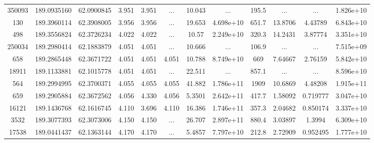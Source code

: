 \begin{table*}
\begin{tabular}{cccccccccccc}
         350093 &     189.0935160 &      62.0900845 &           3.951 &           3.951 &             ... &          10.043 &             ... &           195.5 &             ... &             ... &       1.826e+10 \\
            130 &     189.3960114 &      62.3908005 &           3.956 &           3.956 &             ... &          19.653 &       4.698e+10 &           651.7 &         13.8706 &         4.43789 &       6.843e+10 \\
            498 &     189.3556824 &      62.3726234 &           4.022 &           4.022 &             ... &           10.57 &       2.249e+10 &           320.3 &         14.2431 &         3.87774 &       3.351e+10 \\
         250034 &     189.2980414 &      62.1883879 &           4.051 &           4.051 &             ... &          10.666 &             ... &           106.9 &             ... &             ... &       7.515e+09 \\
            658 &     189.2865448 &      62.3671722 &           4.051 &           4.051 &           4.051 &          10.788 &       8.749e+10 &             669 &         7.64667 &         2.76159 &       5.842e+10 \\
          18911 &     189.1133881 &      62.1015778 &           4.051 &           4.051 &             ... &          22.511 &             ... &           857.1 &             ... &             ... &       8.596e+10 \\
            564 &     189.2994995 &      62.3700371 &           4.055 &           4.055 &           4.055 &          41.882 &       1.786e+11 &            1909 &         10.6869 &         4.48208 &       1.915e+11 \\
            659 &     189.2905884 &      62.3672562 &           4.056 &           4.330 &           4.056 &          5.3501 &       2.642e+11 &           417.7 &         1.58092 &        0.719777 &       3.047e+10 \\
          16121 &     189.1436768 &      62.1616745 &           4.110 &           3.696 &           4.110 &          16.386 &       1.746e+11 &           357.3 &         2.04682 &        0.850174 &       3.337e+10 \\
           3532 &     189.3077393 &      62.3073006 &           4.150 &           4.150 &             ... &          26.707 &       2.897e+11 &           880.4 &         3.03897 &          1.3994 &       6.309e+10 \\
          17538 &     189.0441437 &      62.1363144 &           4.170 &           4.170 &             ... &          5.4857 &       7.797e+10 &           212.8 &         2.72909 &        0.952495 &       1.777e+10 \\

\end{tabular}
\end{table*}
